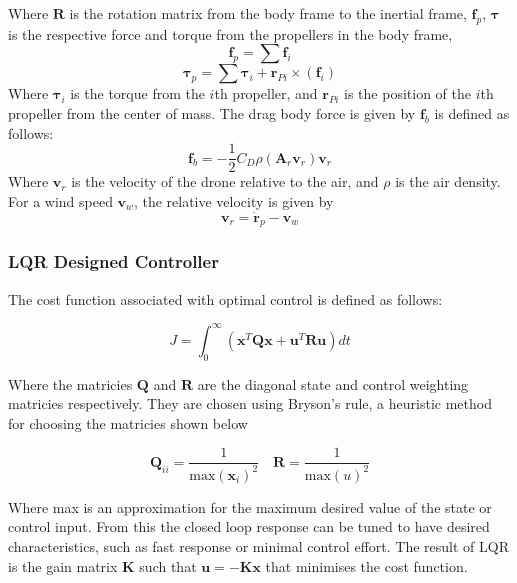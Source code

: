 \documentclass{article}
\begin{document}
Where $\mathbf{R}$ is the rotation matrix from the body frame to the inertial frame,
$\mathbf{f}_p$, $\boldsymbol{\tau}$ is the respective force and torque from the propellers in the body frame,
\begin{equation}
    \mathbf{f}_p = \sum{\mathbf{f}_i}
\end{equation}
\begin{equation}
    \boldsymbol{\tau}_p = \sum{\boldsymbol{\tau}_i + \mathbf{r}_{Pi} \times (\mathbf{f}_i)}
\end{equation}
Where $\boldsymbol{\tau}_i$ is the torque from the $i$th propeller, and $\mathbf{r}_{Pi}$ is the position of the $i$th propeller from the center of mass.
The drag body force is given by $\mathbf{f}_b$ is defined as follows:
\begin{equation}
    \mathbf{f}_b = -\frac{1}{2} C_D \rho (\mathbf{A}_r \mathbf{v}_r ) \mathbf{v}_r
\end{equation}
Where $\mathbf{v}_r$ is the velocity of the drone relative to the air, and $\rho$ is the air density.
For a wind speed $\mathbf{v}_w$, the relative velocity is given by
\begin{equation}
    \mathbf{v}_r = \mathbf{\dot{r}}_p - \mathbf{v}_w
\end{equation}


\subsubsection{LQR Designed Controller}

The cost function associated with optimal control is defined as follows:

\begin{equation}
  J = \int_0^\infty \left( \mathbf{x}^T \mathbf{Q} \mathbf{x} + \mathbf{u}^T \mathbf{R} \mathbf{u} \right) dt
\end{equation}

Where the matricies $\mathbf{Q}$ and $\mathbf{R}$ are the diagonal state and control weighting matricies respectively.
They are chosen using Bryson's rule, a heuristic method for choosing the matricies shown below \cite{feedback_control_of_dynamic_systems}

\begin{equation}
  \mathbf{Q}_{ii} = \frac{1}{\text{max}(\mathbf{x}_i)^2} \quad \mathbf{R} = \frac{1}{\text{max}(u)^2}
\end{equation}

Where max is an approximation for the maximum desired value of the state or control input.
From this the closed loop response can be tuned to have desired characteristics, such as fast response or minimal control effort.
The result of LQR is the gain matrix $\mathbf{K}$ such that $\mathbf{u} = -\mathbf{Kx}$ that minimises the cost function.
\end{document}
